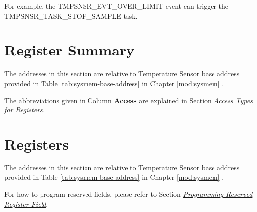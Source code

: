 \documentclass[main\_\_EN.tex]{subfiles}
\begin{document}
For example, the TMPSNSR\_EVT\_OVER\_LIMIT event can trigger the TMPSNSR\_TASK\_STOP\_SAMPLE task.




\clearpage
\hypertarget{tmpsen-reg-summ}{}
\section{Register Summary}
\label{sec:tmpsen-reg-summ}

The addresses in this section are relative to Temperature Sensor base address provided in Table \ref{tab:sysmem-base-address} in Chapter \ref{mod:sysmem} \textit{}.

The abbreviations given in Column \textbf{Access} are explained in Section \hyperref[glossary-access-types]{\textit{Access Types for Registers}}.







\clearpage
\section{Registers}

The addresses in this section are relative to Temperature Sensor base address provided in Table \ref{tab:sysmem-base-address} in Chapter \ref{mod:sysmem} \textit{}.

For how to program reserved fields, please refer to Section \hyperref[programming-reserved-field]{\textit{Programming Reserved Register Field}}.


\end{document}
